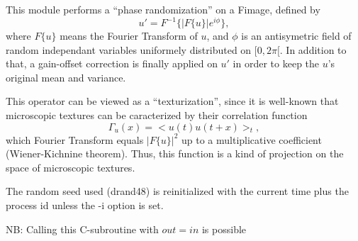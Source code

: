 This module performs a ``phase randomization'' on a Fimage, defined by
$$u' = F^{-1} \{ |F \{ u \} | e^{i \phi} \} ,$$
where $F \{u\}$ means the Fourier Transform of $u$, and $\phi$ is an
antisymetric field of random independant variables uniformely distributed
on $[0,2\pi[$.
In addition to that, a gain-offset correction is finally applied on $u'$ 
in order to keep the $u$'s original mean and variance.

\vskip 0.3cm

This operator can be viewed as a ``texturization'', since it is well-known
that microscopic textures can be caracterized by their correlation function
$$\Gamma_u(x) = <u(t)u(t+x)>_t,$$
which Fourier Transform equals $| F \{ u \} | ^2$ up to a multiplicative 
coefficient (Wiener-Kichnine theorem). Thus, this function is a kind of 
projection on the space of microscopic textures.

\vskip 0.3cm

The random seed used ({\sf drand48}) is reinitialized with the current time
plus the process id unless the -i option is set.

\vskip 0.5cm

NB: Calling this C-subroutine with $out=in$ is possible 
